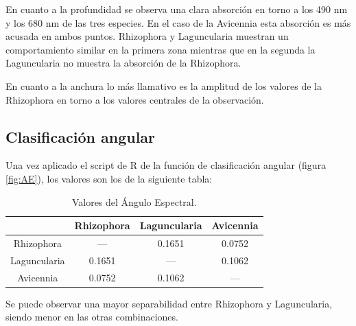 En cuanto a la profundidad se observa una clara absorción en torno a los 490 nm y los 680 nm de las tres especies. En el caso de la Avicennia esta absorción es más acusada en ambos puntos. Rhizophora y Laguncularia muestran un comportamiento similar en la primera zona mientras que en la segunda la Laguncularia no muestra la absorción de la Rhizophora.\Sep

En cuanto a la anchura lo más llamativo es la amplitud de los valores de la Rhizophora en torno a los valores centrales de la observación.

\subsection{Clasificación angular}
Una vez aplicado el script de R de la función de clasificación angular (figura \ref{fig:AE}), los valores son los de la siguiente tabla:

\begin{table}[ht]
	\centering
	\caption[Valores de Ángulo Espectral]{Valores del Ángulo Espectral.}
	\begin{tabular}{|c|c|c|c|}
	\hline
	& Rhizophora & Laguncularia & Avicennia \\
	\hline
	Rhizophora & --- & 0.1651 & 0.0752 \\
	\hline
	Laguncularia & 0.1651 & --- & 0.1062 \\
	\hline
	Avicennia & 0.0752 & 0.1062 & --- \\
	\hline
	\end{tabular}
\end{table}

Se puede observar una mayor separabilidad entre Rhizophora y Laguncularia, siendo menor en las otras combinaciones.